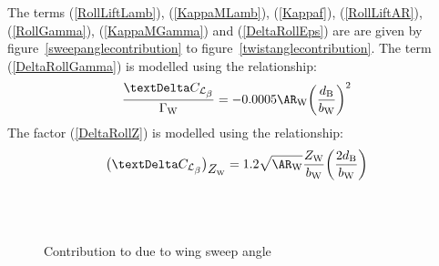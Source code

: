 The terms (\ref{RollLiftLamb}), (\ref{KappaMLamb}), (\ref{Kappaf}), (\ref{RollLiftAR}), (\ref{RollGamma}), (\ref{KappaMGamma}) and (\ref{DeltaRollEps}) are are given by figure~\vref{sweepanglecontribution} to figure~\vref{twistanglecontribution}. The term (\ref{DeltaRollGamma}) is modelled using the relationship:
\begin{equation}
\frac{\textrm \textDelta \CLbeta}{{\GammaW}} = -0.0005 \ARW \biggl( \frac{\dB}{\bW} \biggr)^2
\end{equation}
The factor (\ref{DeltaRollZ}) is modelled using the relationship:
\begin{equation}
\bigl( \textrm \textDelta \CLbeta \bigr)_{\ZW} = 1.2 \sqrt{\ARW} \frac{\ZW}{\bW} \biggl( \frac{2\dB}{\bW} \biggr)
\end{equation}

\begin{figure}[htbp]
\centering
{} \\
 \\
\caption[Contribution to \CLbetaWB due to $\Lambda_{c/2}$] {Contribution to \CLbetaWB due to wing sweep angle}
\label{sweepanglecontribution}
\end{figure}

